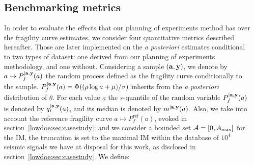 \subsection{Benchmarking metrics}\label{lowdoe:sec:benchamrk}

In order to evaluate the effects that our planning of experiments method has over the fragility curve estimates, we consider four quantitative metrics described hereafter. Those are later implemented on the \emph{a posteriori} estimates conditional to two types of dataset: one derived from our planning of experiments methodology, and one without.
Considering a sample $(\mathbf{a}, \mathbf{y})$, we denote
by $a \mapsto P_f^{|\mathbf{a}, \mathbf{y}}(a)$ the random process defined as the fragility curve conditionally to the sample. $P_f^{|\mathbf{a},\mathbf{y}}(a)=\Phi((\rho\log a+\mu)/\sigma)$ inherits from the \emph{a posteriori} distribution of $\theta$.  
For each value $a$ the $r$-quantile of the random variable $P_f^{|\mathbf{a},\mathbf{y}}(a)$ is denoted by $q_r^{|\mathbf{a},\mathbf{y}}(a)$, and its median is denoted by $m^{|\mathbf{a},\mathbf{y}}(a)$.  
Also, we take into account the reference fragility curve $a\mapsto P_f^{\mathrm{ref}}(a)$, evoked in section~\ref{lowdoe:sec:casestudy}; and we consider a bounded set $\mathcal{A}=[0,A_{\max}]$ for the IM, the truncation is set to the maximal IM within the database of $10^4$ seismic signals we have at disposal for this work, as disclosed in section~\ref{lowdoe:sec:casestudy}. %
    We define:

